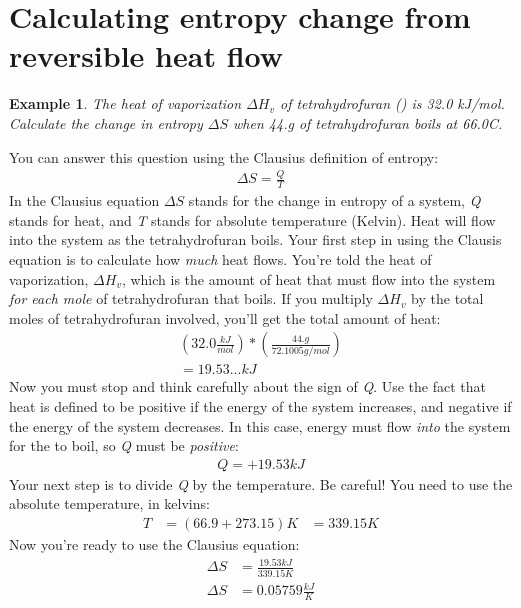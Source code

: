\documentclass{article}  %
\newtheorem{exmp}{Example}
\begin{document}
\section*{Calculating entropy change from reversible heat flow}
\begin{exmp}
    The heat of vaporization $\Delta H_v$ of tetrahydrofuran () is 32.0 kJ/mol. Calculate the change in entropy $\Delta S$ when 44.g of tetrahydrofuran boils at 66.0C.
\end{exmp}
You can answer this question using the Clausius definition of entropy:
\begin{equation*}
    \begin{aligned}
        \Delta S = \frac{Q}{T}
    \end{aligned}
\end{equation*}
In the Clausius equation $\Delta S$ stands for the change in entropy of a system, \emph{Q} stands for heat, and \emph{T} stands for absolute temperature (Kelvin).
\newline    
Heat will flow into the system as the tetrahydrofuran boils. Your first step in using the Clausis equation is to calculate how \emph{much} heat flows.
\newline
You're told the heat of vaporization, $\Delta H_v$, which is the amount of heat that must flow into the system \emph{for each mole} of tetrahydrofuran that boils. If you multiply $\Delta H_v$ by the total moles of tetrahydrofuran involved, you'll get the total amount of heat:
\begin{equation*}
    \begin{aligned}
        (32.0 \frac{kJ}{mol})*(\frac{44.g}{72.1005 g/mol}) \\
        = 19.53...kJ
    \end{aligned}
\end{equation*}
Now you must stop and think carefully about the sign of \emph{Q}. Use the fact that heat is defined to be positive if the energy of the system increases, and negative if the energy of the system decreases. 
\newline
In this case, energy must flow \emph{into} the system for the  to boil, so \emph{Q} must be \emph{positive}:
\begin{equation*}
    \begin{aligned}
        Q = +19.53 kJ
    \end{aligned}
\end{equation*}
Your next step is to divide \emph{Q} by the temperature. Be careful! You need to use the absolute temperature, in kelvins:
\begin{equation*}
    \begin{aligned}
        T &= (66.9+273.15)K 
        &= 339.15K
    \end{aligned}
\end{equation*}
Now you're ready to use the Clausius equation:
\begin{equation*}
    \begin{aligned}
        \Delta S &= \frac{19.53kJ}{339.15K} \\ 
        \Delta S &= 0.05759 \frac{kJ}{K}
    \end{aligned}
\end{equation*}
\end{document}
